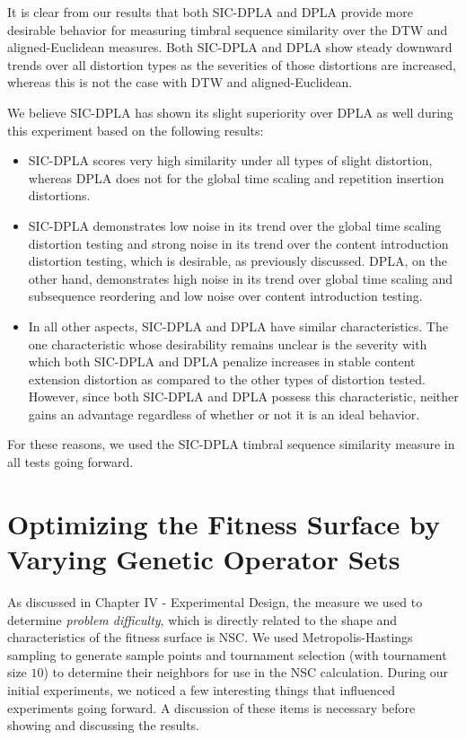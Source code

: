 \documentclass[12pt]{report} 	%
\numberwithin{figure}{chapter}
\numberwithin{table}{chapter}
\numberwithin{equation}{chapter}
\begin{document}
\begin{flushleft}
It is clear from our results that both SIC-DPLA and DPLA provide more desirable behavior for measuring timbral sequence similarity over the DTW and aligned-Euclidean measures. Both SIC-DPLA and DPLA show steady downward trends over all distortion types as the severities of those distortions are increased, whereas this is not the case with DTW and aligned-Euclidean.

We believe SIC-DPLA has shown its slight superiority over DPLA as well during this experiment based on the following results:
\begin{itemize}
\item SIC-DPLA scores very high similarity under all types of slight distortion, whereas DPLA does not for the global time scaling and repetition insertion distortions. 
\item SIC-DPLA demonstrates low noise in its trend over the global time scaling distortion testing and strong noise in its trend over the content introduction distortion testing, which is desirable, as previously discussed. DPLA, on the other hand, demonstrates high noise in its trend over global time scaling and subsequence reordering and low noise over content introduction testing.
\item In all other aspects, SIC-DPLA and DPLA have similar characteristics. The one characteristic whose desirability remains unclear is the severity with which both SIC-DPLA and DPLA penalize increases in stable content extension distortion as compared to the other types of distortion tested. However, since both SIC-DPLA and DPLA possess this characteristic, neither gains an advantage regardless of whether or not it is an ideal behavior.
\end{itemize}

For these reasons, we used the SIC-DPLA timbral sequence similarity measure in all tests going forward.

\section{Optimizing the Fitness Surface by Varying Genetic Operator Sets}
As discussed in Chapter IV - Experimental Design, the measure we used to determine \textit{problem difficulty}, which is directly related to the shape and characteristics of the fitness surface is NSC. We used Metropolis-Hastings sampling to generate sample points and tournament selection (with tournament size $10$) to determine their neighbors for use in the NSC calculation. During our initial experiments, we noticed a few interesting things that influenced experiments going forward. A discussion of these items is necessary before showing and discussing the results.

\end{flushleft}
\end{document}
